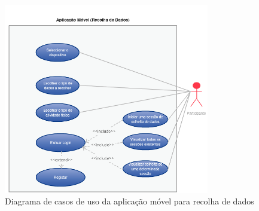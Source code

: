 \begin{figure}[H]
  \centering
  \includegraphics[width=0.8\textwidth]{imgs/app-and-usecase.png}
  \caption[Diagrama de casos de uso da aplicação móvel para recolha de dados]{Diagrama de casos de uso da aplicação móvel para recolha de dados}
  
  \label{f:usecaseandroidapp}
\end{figure}

\newpage


